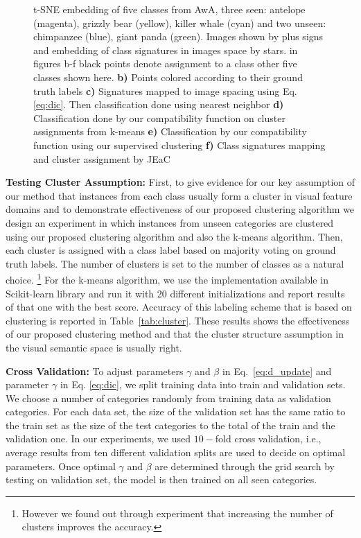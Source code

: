\documentclass[letterpaper]{article}
\begin{document}
\begin{figure}[t]
  \caption{t-SNE embedding of five classes from AwA, three seen: antelope (magenta), grizzly bear (yellow), killer whale (cyan) and two
  unseen: chimpanzee (blue), giant panda (green). Images shown by plus signs and embedding of class signatures in images space by stars.
  in figures b-f black points denote assignment to a class other five classes shown here.
  \textbf{b)} Points colored according to their ground truth labels
  \textbf{c)} Signatures mapped to image spacing using Eq. \eqref{eq:dic}. Then classification done using nearest neighbor
  \textbf{d)} Classification done by our compatibility function on cluster assignments from k-means
  \textbf{e)} Classification by our compatibility function using our supervised clustering
  \textbf{f)} Class signatures mapping and cluster assignment by JEaC
  }
  \label{fig:tsne}
\end{figure}

\textbf{Testing Cluster Assumption:}
First, to give evidence for our key assumption of our method that instances from each class usually form a cluster in visual feature domains
and to demonstrate effectiveness of our proposed clustering algorithm we design an
experiment in which instances from unseen categories are clustered using our proposed clustering algorithm and also the k-means algorithm. Then,
each cluster is assigned with a class label based on majority voting on ground truth labels. The number of clusters
 is set to the number of classes as a natural choice.
 \footnote{However we found out through experiment that increasing the number of clusters improves the accuracy.}
For the k-means algorithm, we use the implementation available in Scikit-learn library \cite{scikit-learn} and run it with 20 different initializations
and report results of that one with the best score.
Accuracy of this labeling scheme that is based on clustering is reported in Table~\ref{tab:cluster}.
These results shows the effectiveness of our proposed clustering method and that the cluster structure assumption in the visual semantic space is usually right.

\textbf{Cross Validation:}
To adjust parameters $\gamma$ and $\beta$ in Eq.~\ref{eq:d_update} and parameter $\gamma$ in Eq. \ref{eq:dic}, we split training data into train and validation sets.
We choose a number of categories randomly from training data as validation categories. For each data set, the size of the
validation set has the same ratio to the train set as the size of the test categories to the total of the train and the validation one.
In our experiments, we used $10-$fold cross validation, i.e., average results from ten different validation splits are used to decide on
optimal parameters.
Once optimal $\gamma$ and $\beta$ are determined through the grid search by testing on validation set, the model
is then trained on all seen categories.
\end{document}
